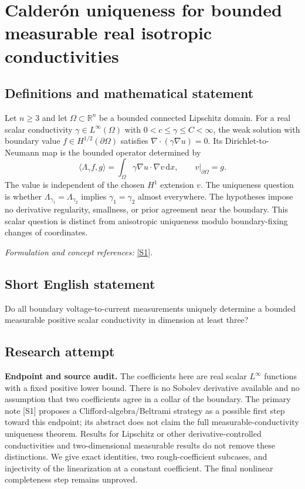 \documentclass[11pt]{article}
\begin{document}
\section*{\texorpdfstring{Calderón uniqueness for bounded measurable real isotropic conductivities}{Calderón uniqueness for bounded measurable real isotropic conductivities}}\label{statement}
\subsection{Definitions and mathematical statement}
Let $n\ge3$ and let $\Omega\subset{\mathbb{R}}^n$ be a bounded connected Lipschitz domain. For a real scalar conductivity $\gamma\in L^\infty(\Omega)$ with $0<c\le\gamma\le C<\infty$, the weak solution with boundary value $f\in H^{1/2}(\partial\Omega)$ satisfies $\nabla\cdot(\gamma\nabla u)=0$. Its Dirichlet-to-Neumann map is the bounded operator determined by
\[
 \langle\Lambda_\gamma f,g\rangle
 =\int_\Omega\gamma\nabla u\cdot\nabla v{\,\mathrm{d}} x,
 \qquad v|_{\partial\Omega}=g.
\]
The value is independent of the chosen $H^1$ extension $v$. The uniqueness question is whether $\Lambda_{\gamma_1}=\Lambda_{\gamma_2}$ implies $\gamma_1=\gamma_2$ almost everywhere. The hypotheses impose no derivative regularity, smallness, or prior agreement near the boundary. This scalar question is distinct from anisotropic uniqueness modulo boundary-fixing changes of coordinates.
\par\smallskip\textit{Formulation and concept references:} \href{https://arxiv.org/pdf/1803.06931v2}{[S1]}.

\subsection{Short English statement}
Do all boundary voltage-to-current measurements uniquely determine a bounded measurable positive scalar conductivity in dimension at least three?
\subsection{Research attempt}
\textbf{Endpoint and source audit.}
The coefficients here are real scalar $L^\infty$ functions with a fixed
positive lower bound.  There is no Sobolev derivative available and no
assumption that two coefficients agree in a collar of the boundary.
The primary note [S1] proposes a Clifford-algebra/Beltrami strategy as a
possible first step toward this endpoint; its abstract does not claim the
full measurable-conductivity uniqueness theorem.  Results for Lipschitz or
other derivative-controlled conductivities and two-dimensional measurable
results do not remove these distinctions.  We give exact identities, two
rough-coefficient subcases, and injectivity of the linearization at a constant
coefficient.  The final nonlinear completeness step remains unproved.
\end{document}
